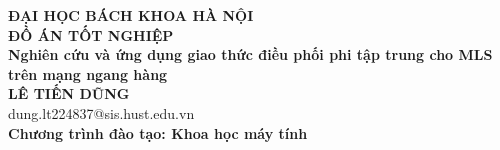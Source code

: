\documentclass[../DoAn.tex]{subfiles}
\begin{document}
\begin{titlepage}
\thispagestyle{empty}
\begin{center}

{\textbf{\large{ĐẠI HỌC BÁCH KHOA HÀ NỘI}}}\\[2cm]

{\textbf{\huge{ ĐỒ ÁN TỐT NGHIỆP}}}\\[1cm]
{\textbf{\Large{Nghiên cứu và ứng dụng giao thức điều phối phi tập trung cho MLS trên mạng ngang hàng}}}\\[1cm]

{\textbf{\large{LÊ TIẾN DŨNG}}}\\
{\large{dung.lt224837@sis.hust.edu.vn}}\\[0.5cm]

{\textbf{\large{Chương trình đào tạo: Khoa học máy tính}}}%

\vspace{2cm}
\begin{table}[H]
\centering
{}
\end{table}
\end{center}



\end{titlepage}
\end{document}
